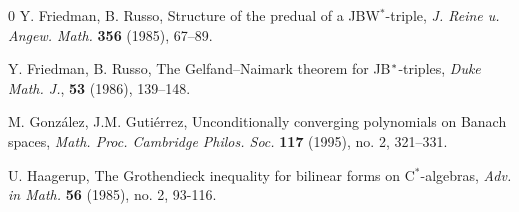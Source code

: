 \documentclass[10pt]{amsart}
\begin{document}
\begin{thebibliography}{0}
		 Y. Friedman, B. Russo, Structure of the predual of a JBW$^*$-triple, \emph{J. Reine u. Angew. Math.} \textbf{356} (1985), 67--89.
		
		 Y. {Friedman}, B. {Russo}, {The Gelfand--Naimark theorem for JB$\sp*$-triples,} {\em {Duke Math. J.}}, \textbf{53} (1986), 139--148.
		
		
		
		
		
		 M. Gonz\'{a}lez, J.M. Guti\'{e}rrez, Unconditionally converging polynomials on Banach spaces, \emph{Math. Proc. Cambridge Philos. Soc.} \textbf{117} (1995), no. 2, 321--331.
		
		
		 U. Haagerup, The Grothendieck inequality for bilinear forms on C$^*$-algebras, \emph{Adv. in Math.} \textbf{56} (1985), no. 2, 93-116.
		
		
		
		
		

\end{thebibliography}
\end{document}
